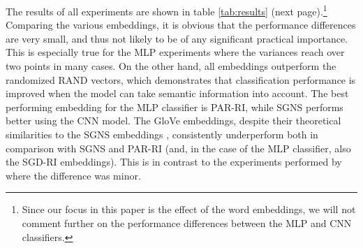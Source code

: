 \documentclass[11pt]{article}
\begin{document}
The results of all experiments are shown in table \ref{tab:results} (next page).\footnote{Since our focus in this paper is the effect of the word embeddings, we will not comment further on the performance differences between the MLP and CNN classifiers.}
Comparing the various embeddings, it is obvious that the performance differences are very small, and thus not likely to be of any significant practical importance. This is especially true for the MLP experiments where the variances reach over two points in many cases. On the other hand, all embeddings outperform the randomized RAND vectors, which demonstrates that classification performance is improved when the model can take semantic information into account. The best performing embedding for the MLP classifier is PAR-RI, while SGNS performs better using the CNN model. The GloVe embeddings, despite their theoretical similarities to the SGNS embeddings \cite{suzuki-nagata:2015:ACL-IJCNLP}, consistently underperform both in comparison with SGNS and PAR-RI (and, in the case of the MLP classifier, also the SGD-RI embeddings). This is in contrast to the experiments performed by \cite{ZhangWallace2015} where the difference was minor.
\end{document}
